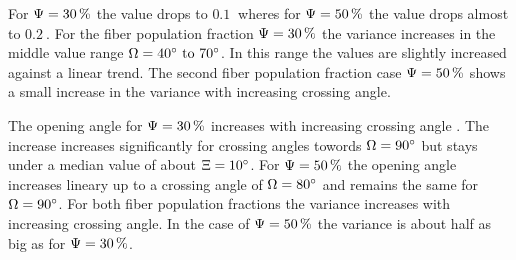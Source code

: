For $\textnormal{$\Psi$} = \SI{30}{\percent}$ the \trel{} value drops to $\SI{0.1}{}$ wheres for $\textnormal{$\Psi$} = \SI{50}{\percent}$ the \trel{} value drops almost to $\SI{0.2}{}$.
For the fiber population fraction $\textnormal{$\Psi$} = \SI{30}{\percent}$ the variance increases in the middle value range $\modelOmega=\SIrange{40}{70}{\degree}$.
In this range the \trel{} values are slightly increased against a linear trend.
The second fiber population fraction case $\textnormal{$\Psi$} = \SI{50}{\percent}$ shows a small increase in the variance with increasing crossing angle.
\par
The opening angle \openingAngle{} for $\textnormal{$\Psi$}=\SI{30}{\percent}$ increases with increasing crossing angle \modelOmega{}.
The increase increases significantly for crossing angles towords $\textnormal{$\Omega$}=\SI{90}{\degree}$ but stays under a median value of about $\textnormal{$\Xi$}=\SI{10}{\degree}$.
For $\textnormal{$\Psi$}=\SI{50}{\percent}$ the opening angle increases lineary up to a crossing angle of $\textnormal{$\Omega$}=\SI{80}{\degree}$ and remains the same for $\textnormal{$\Omega$}=\SI{90}{\degree}$.
For both fiber population fractions the variance increases with increasing crossing angle.
In the case of $\textnormal{$\Psi$}=\SI{50}{\percent}$ the variance is about half as big as for $\textnormal{$\Psi$}=\SI{30}{\percent}$.
%
% 
% 
